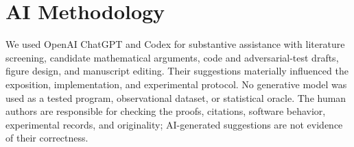\section*{AI Methodology}

We used OpenAI ChatGPT and Codex for substantive assistance with literature screening, candidate mathematical arguments, code and adversarial-test drafts, figure design, and manuscript editing. Their suggestions materially influenced the exposition, implementation, and experimental protocol. No generative model was used as a tested program, observational dataset, or statistical oracle. The human authors are responsible for checking the proofs, citations, software behavior, experimental records, and originality; AI-generated suggestions are not evidence of their correctness.
